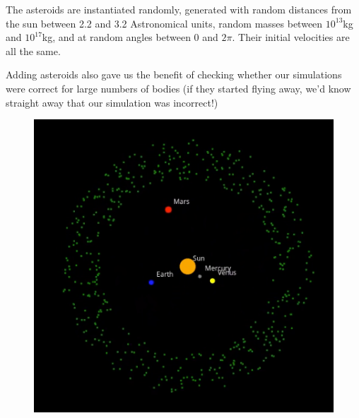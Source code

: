 \documentclass{article}
\begin{document}
The asteroids are instantiated randomly, generated with random distances from the sun between 2.2 and 3.2 Astronomical units, random masses between $10^{13}$kg and $10^{17}$kg, and at random angles between $0$ and $2\pi$. Their initial velocities are all the same.

Adding asteroids also gave us the benefit of checking whether our simulations were correct for large numbers of bodies (if they started flying away, we'd know straight away that our simulation was incorrect!)

\begin{figure}[H]
    \centering
    \begin{minipage}{0.3\textwidth}
        \centering
        \includegraphics[width=\textwidth]{500asteroids.png}
        \label{fig:image1}
    \end{minipage}
    \hfill
    \begin{minipage}{0.3\textwidth}
        \centering

\end{minipage}
\end{figure}
\end{document}

